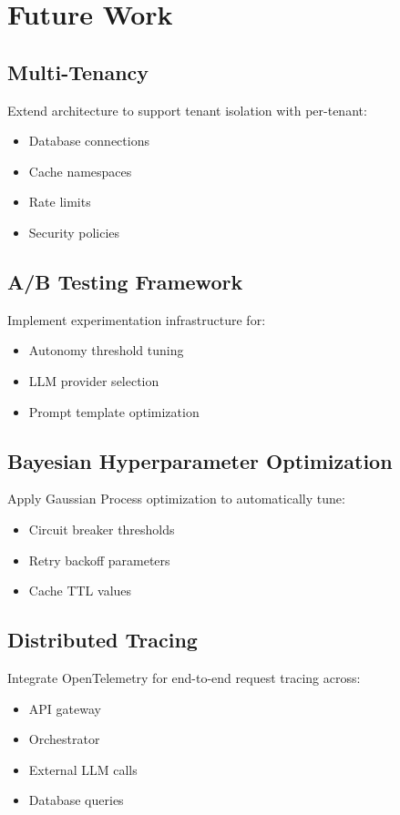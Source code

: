 \documentclass[conference]{IEEEtran}
\begin{document}
\section{Future Work}

\subsection{Multi-Tenancy}

Extend architecture to support tenant isolation with per-tenant:
\begin{itemize}
    \item Database connections
    \item Cache namespaces
    \item Rate limits
    \item Security policies
\end{itemize}

\subsection{A/B Testing Framework}

Implement experimentation infrastructure for:
\begin{itemize}
    \item Autonomy threshold tuning
    \item LLM provider selection
    \item Prompt template optimization
\end{itemize}

\subsection{Bayesian Hyperparameter Optimization}

Apply Gaussian Process optimization to automatically tune:
\begin{itemize}
    \item Circuit breaker thresholds
    \item Retry backoff parameters
    \item Cache TTL values
\end{itemize}

\subsection{Distributed Tracing}

Integrate OpenTelemetry for end-to-end request tracing across:
\begin{itemize}
    \item API gateway
    \item Orchestrator
    \item External LLM calls
    \item Database queries
\end{itemize}
\end{document}
